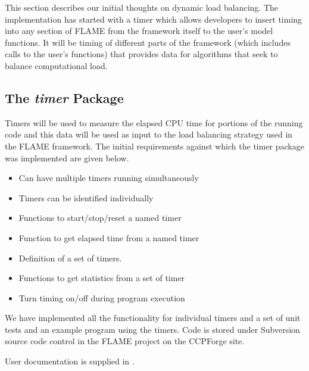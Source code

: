 This section describes our initial thoughts on dynamic load balancing. The implementation has started with a timer which allows developers to insert timing into any section of FLAME from the framework itself to the user's model functions. It will be timing of different parts of the framework (which includes calls to the user's functions) that provides data for algorithms that seek to balance computational load.

\subsection{The \textit{timer} Package}

Timers will be used to measure the elapsed CPU time for portions of the running code and this data will be used as input to the load balancing strategy used in the FLAME framework. The initial requirements against which the timer package was implemented are given below.

\begin{itemize}
\item Can have multiple timers running simultaneously
\item Timers can be identified individually
\item Functions to start/stop/reset a named timer
\item Function to get elapsed time from a named timer
\item Definition of a set of timers.
\item Functions to get statistics from a set of timer
\item Turn timing on/off during program execution 
\end{itemize}

We have implemented all the functionality for individual timers and a set of unit tests and an example program using the timers. Code is stored under Subversion source code control in the FLAME project on the CCPForge site. 

User documentation is supplied in \cite{TimerAPI}.
